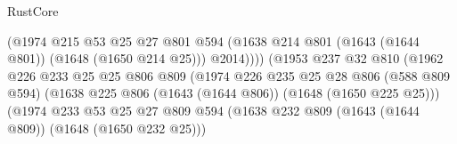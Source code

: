 \begin{lexlean}{RustCore}
\begin{coremodule}
                                              (@1974
                                                @215
                                                @53
                                                @25
                                                @27
                                                @801
                                                @594
                                                (@1638
                                                  @214
                                                  @801
                                                  (@1643 (@1644 @801))
                                                  (@1648 (@1650 @214 @25)))
                                                @2014))))
                                        (@1953
                                          @237
                                          @32
                                          @810
                                          (@1962
                                            @226
                                            @233
                                            @25
                                            @25
                                            @806
                                            @809
                                            (@1974
                                              @226
                                              @235
                                              @25
                                              @28
                                              @806
                                              (@588 @809 @594)
                                              (@1638
                                                @225
                                                @806
                                                (@1643 (@1644 @806))
                                                (@1648 (@1650 @225 @25)))
                                              (@1974
                                                @233
                                                @53
                                                @25
                                                @27
                                                @809
                                                @594
                                                (@1638
                                                  @232
                                                  @809
                                                  (@1643 (@1644 @809))
                                                  (@1648 (@1650 @232 @25)))

\end{coremodule}
\end{lexlean}
